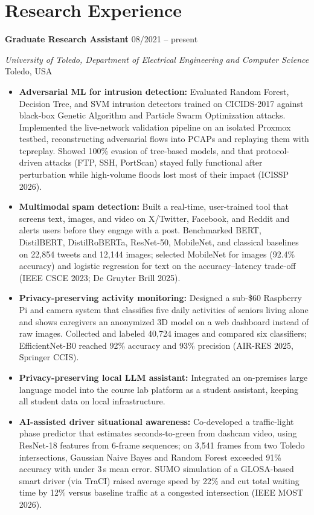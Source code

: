 \documentclass[11pt,a4paper]{article}
\newcommand{\entry}[4]{%
  \textbf{#1} \hfill #2\par
  \textit{#3} \hfill #4\par\vspace{1pt}}
\begin{document}
\section{Research Experience}
\entry{Graduate Research Assistant}{08/2021 -- present}
      {University of Toledo, Department of Electrical Engineering and Computer Science}{Toledo, USA}
\begin{itemize}
  \item \textbf{Adversarial ML for intrusion detection:} Evaluated Random Forest,
        Decision Tree, and SVM intrusion detectors trained on CICIDS-2017 against
        black-box Genetic Algorithm and Particle Swarm Optimization attacks.
        Implemented the live-network validation pipeline on an isolated Proxmox testbed,
        reconstructing adversarial flows into PCAPs and replaying them with tcpreplay.
        Showed 100\% evasion of tree-based models, and that protocol-driven attacks
        (FTP, SSH, PortScan) stayed fully functional after perturbation while
        high-volume floods lost most of their impact (ICISSP 2026).
  \item \textbf{Multimodal spam detection:} Built a real-time, user-trained tool that
        screens text, images, and video on X/Twitter, Facebook, and Reddit and alerts
        users before they engage with a post. Benchmarked BERT, DistilBERT,
        DistilRoBERTa, ResNet-50, MobileNet, and classical baselines on 22,854 tweets
        and 12,144 images; selected MobileNet for images (92.4\% accuracy) and logistic
        regression for text on the accuracy--latency trade-off (IEEE CSCE 2023;
        De Gruyter Brill 2025).
  \item \textbf{Privacy-preserving activity monitoring:} Designed a sub-\$60 Raspberry Pi
        and camera system that classifies five daily activities of seniors living alone
        and shows caregivers an anonymized 3D model on a web dashboard instead of raw
        images. Collected and labeled 40,724 images and compared six classifiers;
        EfficientNet-B0 reached 92\% accuracy and 93\% precision (AIR-RES 2025,
        Springer CCIS).
  \item \textbf{Privacy-preserving local LLM assistant:} Integrated an on-premises large
        language model into the course lab platform as a student assistant, keeping
        all student data on local infrastructure.
  \item \textbf{AI-assisted driver situational awareness:} Co-developed a traffic-light phase
        predictor that estimates seconds-to-green from dashcam video, using ResNet-18
        features from 6-frame sequences; on 3,541 frames from two Toledo intersections,
        Gaussian Naive Bayes and Random Forest exceeded 91\% accuracy with under 3\,s
        mean error. SUMO simulation of a GLOSA-based smart driver (via TraCI) raised
        average speed by 22\% and cut total waiting time by 12\% versus baseline
        traffic at a congested intersection (IEEE MOST 2026).
\end{itemize}
\end{document}
